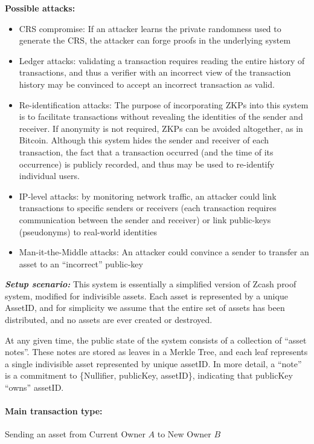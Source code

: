 		
\textbf{Possible attacks:}
\begin{itemize}
 \item CRS compromise: If an attacker learns the private randomness used to generate the CRS, the attacker can forge proofs in the underlying system
 \item Ledger attacks: validating a transaction requires reading the entire history of transactions, and thus a verifier with an incorrect view of the transaction history may be convinced to accept an incorrect transaction as valid.
 \item Re-identification attacks: The purpose of incorporating ZKPs into this system is to facilitate transactions without revealing the identities of the sender and receiver.  If anonymity is not required, ZKPs can be avoided altogether, as in Bitcoin.  Although this system hides the sender and receiver of each transaction, the fact that a transaction occurred (and the time of its occurrence) is publicly recorded, and thus may be used to re-identify individual users.
 \item IP-level attacks: by monitoring network traffic, an attacker could link transactions to specific senders or receivers (each transaction requires communication between the sender and receiver) or link public-keys (pseudonyms) to real-world identities
 \item Man-it-the-Middle attacks: An attacker could convince a sender to transfer an asset to an “incorrect” public-key
\end{itemize}


\emph{\textbf{Setup scenario:}}  This system is essentially a simplified version of Zcash proof system, modified for indivisible assets.  Each asset is represented by a unique AssetID, and for simplicity we assume that the entire set of assets has been distributed, and no assets are ever created or destroyed.

At any given time, the public state of the system consists of a collection of “asset notes”.  These notes are stored as leaves in a Merkle Tree, and each leaf represents a single indivisible asset represented by unique assetID.  In more detail, a “note” is a commitment to \{Nullifier, publicKey, assetID\}, indicating that publicKey “owns” assetID.


\paragraph{Main transaction type:} 
Sending an asset from Current Owner $A$ to New Owner $B$

